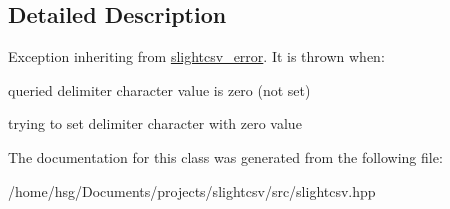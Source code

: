 \subsection{Detailed Description}
Exception inheriting from \hyperlink{classutils_1_1slightcsv__error}{slightcsv\+\_\+error}. It is thrown when\+:
\begin{DoxyItemize}
\item queried delimiter character value is zero (not set)
\item trying to set delimiter character with zero value 
\end{DoxyItemize}

The documentation for this class was generated from the following file\+:\begin{DoxyCompactItemize}
\item 
/home/hsg/\+Documents/projects/slightcsv/src/slightcsv.\+hpp\end{DoxyCompactItemize}
